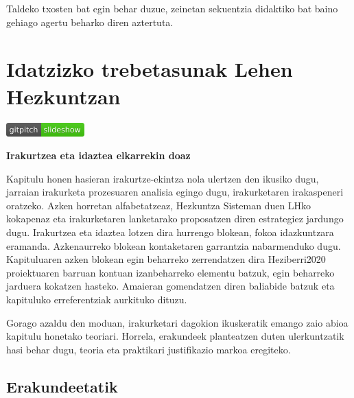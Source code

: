 \documentclass[
]{book}
\begin{document}
Taldeko txosten bat egin behar duzue, zeinetan sekuentzia didaktiko bat baino gehiago agertu beharko diren aztertuta.

\hypertarget{idatzizko-trebetasunak-lehen-hezkuntzan}{%
\chapter{Idatzizko trebetasunak Lehen Hezkuntzan}\label{idatzizko-trebetasunak-lehen-hezkuntzan}}

\href{../Diapoak/04_Diap-idatzizko_trebetasunak.html}{\includegraphics{assets/badge.png}}

\textbf{Irakurtzea eta idaztea elkarrekin doaz}

Kapitulu honen hasieran irakurtze-ekintza nola ulertzen den ikusiko dugu, jarraian irakurketa prozesuaren analisia egingo dugu, irakurketaren irakaspeneri oratzeko. Azken horretan alfabetatzeaz, Hezkuntza Sisteman duen LHko kokapenaz eta irakurketaren lanketarako proposatzen diren estrategiez jardungo dugu. Irakurtzea eta idaztea lotzen dira hurrengo blokean, fokoa idazkuntzara eramanda. Azkenaurreko blokean kontaketaren garrantzia nabarmenduko dugu. Kapituluaren azken blokean egin beharreko zerrendatzen dira Heziberri2020 proiektuaren barruan kontuan izanbeharreko elementu batzuk, egin beharreko jarduera kokatzen hasteko. Amaieran gomendatzen diren baliabide batzuk eta kapituluko erreferentziak aurkituko dituzu.

Gorago azaldu den moduan, irakurketari dagokion ikuskeratik emango zaio abioa kapitulu honetako teoriari. Horrela, erakundeek planteatzen duten ulerkuntzatik hasi behar dugu, teoria eta praktikari justifikazio markoa eregiteko.

\hypertarget{erakundeetatik}{%
\section{Erakundeetatik}\label{erakundeetatik}}
\end{document}
